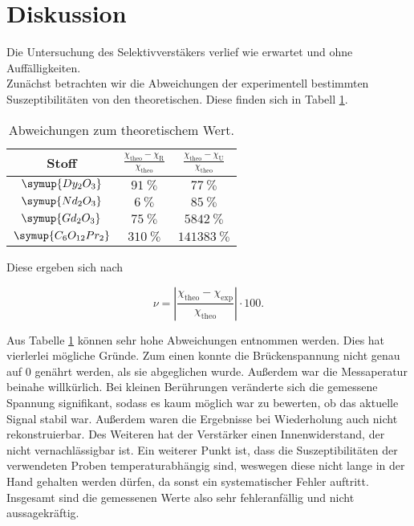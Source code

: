 \section{Diskussion}
\label{sec:Diskussion}

Die Untersuchung des Selektivverstäkers verlief wie erwartet 
und ohne Auffälligkeiten. \\
Zunächst betrachten wir die Abweichungen der experimentell 
bestimmten Suszeptibilitäten von den theoretischen. Diese finden 
sich in Tabell \ref{tab:Messdaten8}.

\begin{table}
\centering
\caption{Abweichungen zum theoretischem Wert.}
\label{tab:Messdaten8}
\begin{tabular}{c c c}
\toprule
Stoff & $\frac{\chi_\text{theo}-\chi_\text{R}}{\chi_\text{theo}}$ & $\frac{\chi_\text{theo}-\chi_\text{U}}{\chi_\text{theo}}$\\ 
\midrule
$\symup{Dy_2O_3}$       & $\SI{91}{\percent}$ & $\SI{77}{\percent}$\\
$\symup{Nd_2O_3}$       & $\SI{6}{\percent}$ & $\SI{85}{\percent}$\\
$\symup{Gd_2O_3}$       & $\SI{75}{\percent}$ & $\SI{5842}{\percent}$\\
$\symup{C_6O_{12}Pr_2}$ & $\SI{310}{\percent}$ & $\SI{141383}{\percent}$\\
\bottomrule
\end{tabular}
\end{table}

Diese ergeben sich nach 

\begin{equation*}
\nu = \left|\frac{\chi_\text{theo}-\chi_\text{exp}}{\chi_\text{theo}}\right| \cdot 100.
\end{equation*}

Aus Tabelle \ref{tab:Messdaten8} können sehr hohe Abweichungen 
entnommen werden. Dies hat vierlerlei mögliche Gründe. 
Zum einen konnte die Brückenspannung nicht genau auf 0 genährt 
werden, als sie abgeglichen wurde. Außerdem war die 
Messaperatur beinahe willkürlich. Bei kleinen Berührungen veränderte 
sich die gemessene Spannung signifikant, sodass es kaum möglich war
zu bewerten, ob das aktuelle Signal stabil war. Außerdem waren die 
Ergebnisse bei Wiederholung auch nicht rekonstruierbar. Des Weiteren
hat der Verstärker einen Innenwiderstand, der nicht vernachlässigbar ist. 
Ein weiterer Punkt ist, dass die Suszeptibilitäten der verwendeten Proben
temperaturabhängig sind, weswegen diese nicht lange in der Hand 
gehalten werden dürfen, da sonst ein systematischer Fehler auftritt. 
Insgesamt sind die gemessenen Werte also sehr fehleranfällig und 
nicht aussagekräftig. 

